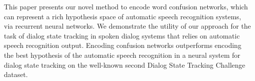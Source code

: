 This paper presents our novel method to encode word confusion networks, which can represent a rich hypothesis space of automatic speech recognition systems, via recurrent neural networks. We demonstrate the utility of our approach for the task of dialog state tracking in spoken dialog systems that relies on automatic speech recognition output. Encoding confusion networks outperforms encoding the best hypothesis of the automatic speech recognition in a neural system for dialog state tracking on the well-known second Dialog State Tracking Challenge dataset.
